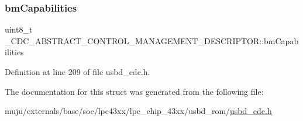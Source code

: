\subsubsection{\texorpdfstring{bm\+Capabilities}{bmCapabilities}}
{\footnotesize\ttfamily uint8\+\_\+t \+\_\+\+C\+D\+C\+\_\+\+A\+B\+S\+T\+R\+A\+C\+T\+\_\+\+C\+O\+N\+T\+R\+O\+L\+\_\+\+M\+A\+N\+A\+G\+E\+M\+E\+N\+T\+\_\+\+D\+E\+S\+C\+R\+I\+P\+T\+O\+R\+::bm\+Capabilities}



Definition at line 209 of file usbd\+\_\+cdc.\+h.



The documentation for this struct was generated from the following file\+:\begin{DoxyCompactItemize}
\item 
muju/externals/base/soc/lpc43xx/lpc\+\_\+chip\+\_\+43xx/usbd\+\_\+rom/\hyperlink{usbd__cdc_8h}{usbd\+\_\+cdc.\+h}\end{DoxyCompactItemize}
